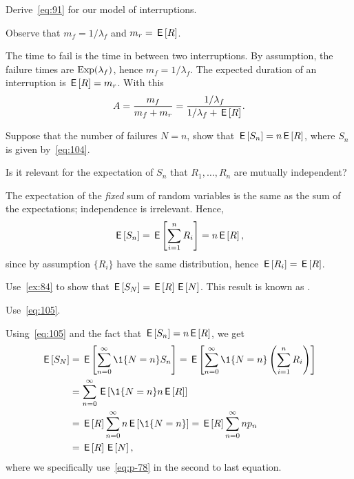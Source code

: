 \begin{exercise}
 Derive~\cref{eq:91} for our model of interruptions.
\begin{hint}
 Observe that $m_f = 1/\lambda_f$ and $m_r = \,\mathsf{E}\left[R\right]$.
\end{hint}
\begin{solution}
  The time to fail is the time in between two interruptions.
  By assumption, the failure times are $\operatorname{Exp}(\lambda_f)$, hence $m_f = 1/\lambda_f$. 
  The expected duration of an interruption is $\,\mathsf{E}\left[R\right] = m_r$.
  With this
\begin{equation*}
 A=\frac{m_f}{m_f + m_r}=\frac{1/\lambda_f }{1/\lambda_f + \,\mathsf{E}\left[R\right]}. 
\end{equation*}
\end{solution}
\end{exercise}


\begin{extra}
 Suppose that the number of failures $N=n$, show that $\,\mathsf{E}\left[S_n\right]=n\,\mathsf{E}\left[R\right]$, where $S_n$ is given by~\cref{eq:104}. 
\begin{hint}
 Is it relevant for the expectation of $S_n$ that $R_1,\ldots, R_n$ are mutually independent?
\end{hint}
\begin{solution}
  The expectation of the \emph{fixed} sum of random variables is the same as the sum of the expectations; independence is irrelevant.
  Hence,
\begin{equation*}
 \,\mathsf{E}\left[S_n \right] = \,\mathsf{E}\left[\sum_{i=1}^n R_i\right]= n \,\mathsf{E}\left[R\right], 
\end{equation*}
since by assumption $\{R_i\}$ have the same distribution, hence $\,\mathsf{E}\left[R_i\right] = \,\mathsf{E}\left[R\right]$.
\end{solution}
\end{extra}


\begin{extra}
 Use~\cref{ex:84} to show that $\,\mathsf{E}\left[S_N\right]=\,\mathsf{E}\left[R\right] \,\mathsf{E}\left[N\right]$.
 This result is known as .
\begin{hint}
 Use~\cref{eq:105}. 
\end{hint}
\begin{solution}
Using~\cref{eq:105} and the fact that $\,\mathsf{E}\left[S_n\right] = n \,\mathsf{E}\left[R\right]$, we get
\begin{align*}
 \E{S_N } 
&= \E{ \sum_{n=0}^\infty \1{N=n} S_n } 
= \E{ \sum_{n=0}^\infty \1{N=n} \left(\sum_{i=1}^n R_i \right)} \\
&= \sum_{n=0}^\infty \E{\1{N=n} n\E{R}} \\
&= \E{R} \sum_{n=0}^\infty n \E{\1{N=n}} = \E R \sum_{n=0}^\infty n p_n\\
&= \E R \E N,
\end{align*}
where we specifically use~\cref{eq:p-78} in the second to last equation.
\end{solution}
\end{extra}


